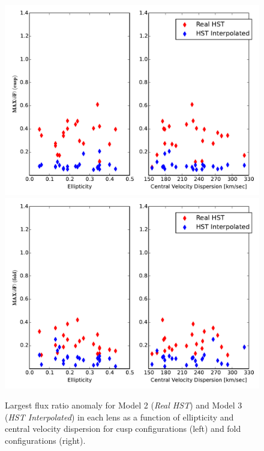 \begin{figure}
	{\includegraphics[trim=0cm 0cm 0cm
		0cm,clip,width=.48\textwidth]{./figures_sls/EllipVdis_vs_fluxratio_maxanomaly_cusprebinsmooth-eps-converted-to.pdf}}
	{\includegraphics[trim=0cm 0cm 0cm
		0cm,clip,width=.48\textwidth]{./figures_sls/EllipVdis_vs_fluxratio_maxanomaly_foldrebinsmooth-eps-converted-to.pdf}}
	\caption{\label{fig:fluxratios_23}Largest flux ratio anomaly for Model 2 (\textit{Real HST}) and Model 3 (\textit{HST Interpolated}) in each lens as a function of ellipticity and central velocity dispersion for cusp configurations (left) and fold configurations (right).}
\end{figure}
